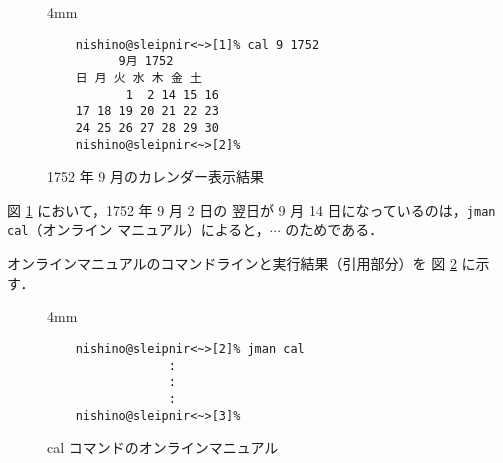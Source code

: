 \documentclass[a4j]{jreport}
\begin{document}
\begin{enumerate}[labelindent=\parindent, leftmargin=*, label=課題 \arabic*）]
	  \begin{figure}[H]	%
	    \centering		%
              \begin{screen}[3]	%
                \setlength{\baselineskip} {4mm} %
	        \begin{verbatim}
	nishino@sleipnir<~>[1]% cal 9 1752
	      9月 1752
	日 月 火 水 木 金 土
	       1  2 14 15 16
	17 18 19 20 21 22 23
	24 25 26 27 28 29 30
	nishino@sleipnir<~>[2]%
	        \end{verbatim}
	        \vspace*{-18pt}
	      \end{screen}
	      \caption{1752 年 9 月のカレンダー表示結果} %
	      \label{Figure: cal 9 1752} %
	  \end{figure}

	図 \ref{Figure: cal 9 1752} において，1752 年 9 月 2 日の
	翌日が 9 月 14 日になっているのは，\texttt{jman cal}（オンライン
	マニュアル）によると，$\cdots$ のためである．

	オンラインマニュアルのコマンドラインと実行結果（引用部分）を
	図 \ref{Figure: jman cal} に示す．

	  \begin{figure}[H]
	    \centering
	      \begin{screen}[3]
	        \setlength{\baselineskip} {4mm}
	        \begin{verbatim}
	nishino@sleipnir<~>[2]% jman cal
	             :
	             :
	             :
	nishino@sleipnir<~>[3]%
	        \end{verbatim}
	        \vspace*{-18pt}
	      \end{screen}
	      \caption{cal コマンドのオンラインマニュアル}
	      \label{Figure: jman cal}
	  \end{figure}


\end{enumerate}
\end{document}
